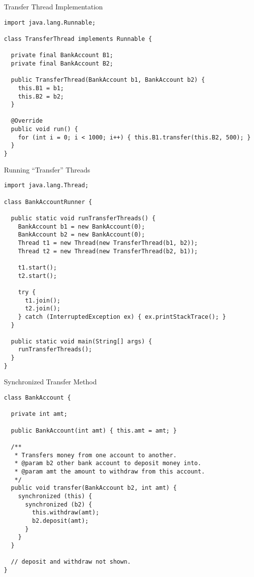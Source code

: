 \begin{cl}{Transfer Thread Implementation}
\begin{lstlisting}[language=MyJava]
import java.lang.Runnable;

class TransferThread implements Runnable {

  private final BankAccount B1;
  private final BankAccount B2;

  public TransferThread(BankAccount b1, BankAccount b2) {
    this.B1 = b1;
    this.B2 = b2;
  }

  @Override
  public void run() {
    for (int i = 0; i < 1000; i++) { this.B1.transfer(this.B2, 500); }
  }
}
\end{lstlisting}
\end{cl}

\begin{cl}{Running ``Transfer'' Threads}
\begin{lstlisting}[language=MyJava]
import java.lang.Thread;

class BankAccountRunner {

  public static void runTransferThreads() {
    BankAccount b1 = new BankAccount(0);
    BankAccount b2 = new BankAccount(0);
    Thread t1 = new Thread(new TransferThread(b1, b2));
    Thread t2 = new Thread(new TransferThread(b2, b1));

    t1.start();
    t2.start();

    try {
      t1.join();
      t2.join();
    } catch (InterruptedException ex) { ex.printStackTrace(); }
  }

  public static void main(String[] args) {
    runTransferThreads();
  }
}
\end{lstlisting}
\end{cl}

\begin{cl}[]{Synchronized Transfer Method}
\begin{lstlisting}[language=MyJava]
class BankAccount {

  private int amt;

  public BankAccount(int amt) { this.amt = amt; }

  /**
   * Transfers money from one account to another.
   * @param b2 other bank account to deposit money into.
   * @param amt the amount to withdraw from this account.
   */
  public void transfer(BankAccount b2, int amt) {
    synchronized (this) {
      synchronized (b2) {
        this.withdraw(amt);
        b2.deposit(amt);
      }
    }
  }

  // deposit and withdraw not shown.
}
\end{lstlisting}
\end{cl}

